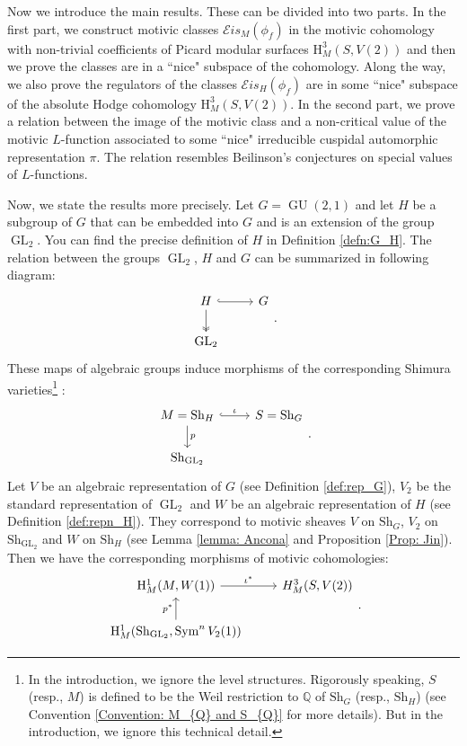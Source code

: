 \documentclass[11pt, a4paper]{amsart}
\theoremstyle{plain}
\theoremstyle{definition}
\numberwithin{equation}{section}
\def\QQ{\mathbb{Q}}
\DeclareMathOperator{\Sym}{Sym}
\DeclareMathOperator{\GU}{GU}
\DeclareMathOperator{\GL}{\mathrm{GL}}
\newcommand{\Sh}{\mathrm{Sh}}
\begin{document}
Now we introduce the main results. These can be divided into two parts. In the first part, we construct motivic classes $\mathcal{E}is_{M}(\phi_f)$ in the motivic cohomology with non-trivial coefficients of Picard modular surfaces $\mathrm{H}^{3}_{M}(S, V(2))$ and then we prove the classes are in a ``nice" subspace of the cohomology.  Along the way, we also prove the regulators of the classes $\mathcal{E}is_{H}(\phi_f)$ are in some ``nice" subspace of the absolute Hodge cohomology $\mathrm{H}^{3}_{M}(S, V(2))$. In the second part, we prove a relation between the image of the motivic class and a non-critical value of the motivic $L$-function associated to some ``nice" irreducible cuspidal automorphic representation $\pi$. The relation resembles Beilinson's conjectures on special values of $L$-functions.

\par Now, we state the results more precisely. Let $G = \GU(2, 1)$ and let $H$ be a subgroup of $G$ that can be embedded into $G$ and is an extension of the group $\GL_2$. You can find the precise definition of $H$ in Definition \ref{defn:G_H}. The relation between the groups $\GL_2$, $H$ and $G$ can be summarized in  following diagram: 
\[
    \begin{tikzcd}
        H \ar[r, hook] \ar[d, twoheadrightarrow] & G  \\
        \GL_2  &  
    \end{tikzcd}. 
\]
These maps of algebraic groups induce morphisms of the corresponding Shimura varieties\footnote{In the introduction, we ignore the level structures. Rigorously speaking, $S$ (resp., $M$) is defined to be the Weil restriction to $\QQ$ of $\Sh_{G}$ (resp., $\Sh_{H}$) (see Convention \ref{Convention: M_{Q} and S_{Q}} for more details). But in the introduction, we ignore this technical detail.} : 
\[
    \begin{tikzcd}
        M = \Sh_H \ar[r, hook, "\iota"] \ar[d, rightarrow, "p"] & S=\Sh_G  \\
        \Sh_{\GL_2}  &  
    \end{tikzcd}. 
\]
Let $V$ be an algebraic representation of $G$ (see Definition \ref{def:rep_G}), $V_2$ be the standard representation of $\GL_{2}$ and $W$ be an algebraic representation of $H$ (see Definition \ref{def:repn_H}). They correspond to motivic sheaves $V$ on $\Sh_{G}$, $V_2$ on $\Sh_{\GL_2}$ and $W$ on $\Sh_{H}$ (see Lemma \ref{lemma: Ancona} and Proposition \ref{Prop: Jin}). Then we have the corresponding morphisms of motivic cohomologies: 
\[
    \begin{tikzcd}
        \mathrm{H}_{M}^{1}(M, W(1)) \ar[r, "\iota^{*}"] & H^{3}_{M}(S, V(2))  \\
        \mathrm{H}_{M}^{1}(\Sh_{\GL_2}, \Sym^{n}V_2(1))  \ar[u, "p^{*}"] &  
    \end{tikzcd}. 
\]
\end{document}
